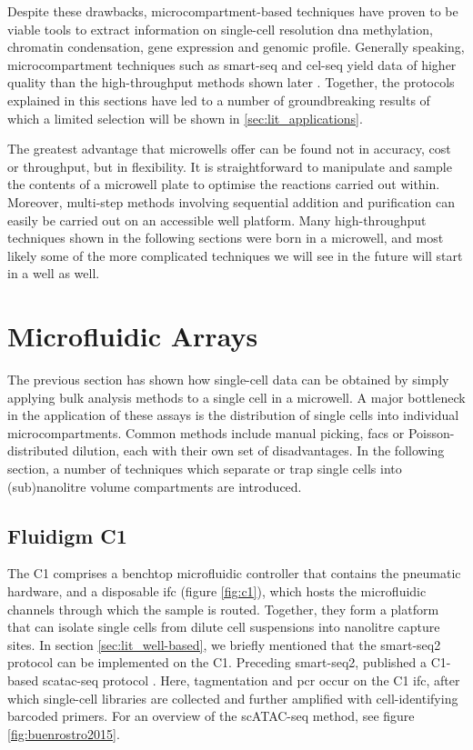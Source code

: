 Despite these drawbacks, microcompartment-based techniques have proven to be viable tools to extract information on single-cell resolution \acrshort{dna} methylation, chromatin condensation, gene expression and genomic profile. Generally speaking, microcompartment techniques such as \acrshort{smart-seq} and \acrshort{cel-seq} yield data of higher quality than the high-throughput methods shown later \citep{ziegenhain2017}. Together, the protocols explained in this sections have led to a number of groundbreaking results of which a limited selection will be shown in \ref{sec:lit_applications}.\pms

The greatest advantage that microwells offer can be found not in accuracy, cost or throughput, but in flexibility. It is straightforward to manipulate and sample the contents of a microwell plate to optimise the reactions carried out within. Moreover, multi-step methods involving sequential addition and purification can easily be carried out on an accessible well platform. Many high-throughput techniques shown in the following sections were born in a microwell, and most likely some of the more complicated techniques we will see in the future will start in a well as well.\pms

\newpage
\section{Microfluidic Arrays}
\label{sec:lit_microarrays}
The previous section has shown how single-cell data can be obtained by simply applying bulk analysis methods to a single cell in a microwell. A major bottleneck in the application of these assays is the distribution of single cells into individual microcompartments. Common methods include manual picking, \acrshort{facs} or Poisson-distributed dilution, each with their own set of disadvantages. In the following section, a number of techniques which separate or trap single cells into (sub)nanolitre volume compartments are introduced.\pms

\subsection{Fluidigm C1}
\label{subsect:lit_fluidigm_c1}
The C1 comprises a benchtop microfluidic controller that contains the pneumatic hardware, and a disposable \acrfull{ifc} (figure \ref{fig:c1}), which hosts the microfluidic channels through which the sample is routed. Together, they form a platform that can isolate single cells from dilute cell suspensions into nanolitre capture sites. In section \ref{sec:lit_well-based}, we briefly mentioned that the \acrshort{smart-seq}2 protocol can be implemented on the C1. Preceding \acrshort{smart-seq}2, \citeauthor{buenrostro2015} published a C1-based \acrshort{scatac-seq} protocol \citep{buenrostro2015}. Here, tagmentation and \acrshort{pcr} occur on the C1 \acrshort{ifc}, after which single-cell libraries are collected and further amplified with cell-identifying barcoded primers. For an overview of the \citeauthor{buenrostro2015} scATAC-seq method, see figure \ref{fig:buenrostro2015}.\pms


